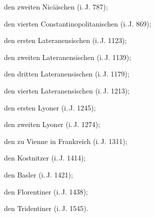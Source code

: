 \begin{aufza}
\begin{aufzb}
\begin{leercompactenum}
\item den zweiten Nicäischen (i.\,J. 787);
\item den vierten Constantinopolitanischen (i.\,J. 869);
\item den ersten Lateranensischen (i.\,J. 1123);~
\item den zweiten Lateranensischen (i.\,J. 1139);
\item den dritten Lateranensischen (i.\,J. 1179);
\item den vierten Lateranensischen (i.\,J. 1213);
\item den ersten Lyoner (i.\,J. 1245);
\item den zweiten Lyoner (i.\,J. 1274);
\item den zu Vienne in Frankreich (i.\,J. 1311);
\item den Kostnitzer (i.\,J. 1414); 
\item den Basler (i.\,J. 1421); 
\item den Florentiner (i.\,J. 1438); 
\item den Tridentiner (i.\,J. 1545).
\end{leercompactenum}
\end{aufzb}
\end{aufza}


